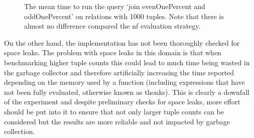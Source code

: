 \begin{figure}[p]
    \centering
    
    \caption{The mean time to run the query `join evenOnePercent and oddOnePercent' on
    relations with 1000 tuples. Note that there is almost no difference compared
the nf evaluation strategy.}
    \label{fig:evaluation:nf-whnf-join-evenOnePercent-and-oddOnePercent}
\end{figure}

On the other hand, the implementation has not been thoroughly checked for space
leaks. The problem with space leaks in this domain is that when benchmarking
higher tuple counts this could lead to much time being wasted in the garbage
collector and therefore artificially increasing the time reported depending on
the memory used by a function (including expressions that have not been fully
evaluated, otherwise known as thonks). This is clearly a downfall of the
experiment and despite preliminary checks for space leaks, more effort should be
put into it to ensure that not only larger tuple counts can be considered but
the results are more reliable and not impacted by garbage collection.
